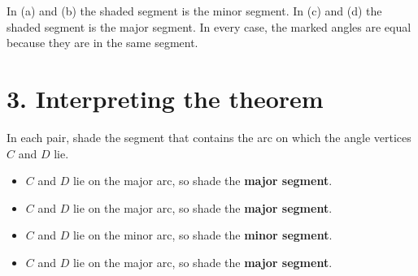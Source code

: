 \documentclass[11pt,a4paper]{article}
\begin{document}
In (a) and (b) the shaded segment is the minor segment.  
In (c) and (d) the shaded segment is the major segment.  
In every case, the marked angles are equal because they are in the same segment.

\section*{3. Interpreting the theorem}

In each pair, shade the segment that contains the arc on which the angle vertices \(C\) and \(D\) lie.

\begin{itemize}
  \item[(a)] \(C\) and \(D\) lie on the major arc, so shade the \textbf{major segment}.
  \item[(b)] \(C\) and \(D\) lie on the major arc, so shade the \textbf{major segment}.
  \item[(c)] \(C\) and \(D\) lie on the minor arc, so shade the \textbf{minor segment}.
  \item[(d)] \(C\) and \(D\) lie on the major arc, so shade the \textbf{major segment}.
\end{itemize}
\end{document}
